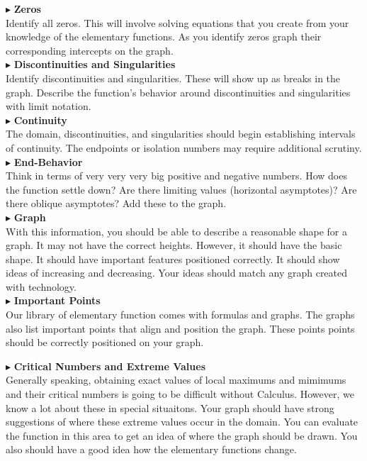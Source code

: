 \documentclass{ximera}
\begin{document}
$\blacktriangleright$ \textbf{\textcolor{red!10!blue!90!}{Zeros}} \\
Identify all zeros.  This will involve solving equations that you create from your knowledge of the elementary functions. As you identify zeros graph their corresponding intercepts on the graph.\\




$\blacktriangleright$ \textbf{\textcolor{red!10!blue!90!}{Discontinuities and Singularities}} \\
Identify discontinuities and singularities.  These will show up as breaks in the graph. Describe the function's behavior around discontinuities and singularities with limit notation.\\





$\blacktriangleright$ \textbf{\textcolor{red!10!blue!90!}{Continuity}} \\
The domain, discontinuities, and singularities should begin establishing intervals of continuity.  The endpoints or isolation numbers may require additional scrutiny.  \\


$\blacktriangleright$ \textbf{\textcolor{red!10!blue!90!}{End-Behavior}} \\
Think in terms of very very very big positive and negative numbers.  How does the function settle down?  Are there limiting values (horizontal asymptotes)?  Are there oblique asymptotes? Add these to the graph. \\


$\blacktriangleright$ \textbf{\textcolor{red!10!blue!90!}{Graph}} \\
With this information, you should be able to describe a reasonable shape for a graph.  It may not have the correct heights. However, it should have the basic shape.  It should have important features positioned correctly. It should show ideas of increasing and decreasing. Your ideas should match any graph created with technology.\\


$\blacktriangleright$ \textbf{\textcolor{red!10!blue!90!}{Important Points}} \\
Our library of elementary function comes with formulas and graphs.  The graphs also list important points that align and position the graph.  These points points should be correctly positioned on your graph.


$\blacktriangleright$ \textbf{\textcolor{red!10!blue!90!}{Critical Numbers and Extreme Values}} \\
Generally speaking, obtaining exact values of local maximums and mimimums and their critical numbers is going to be difficult without Calculus.  However, we know a lot about these in special situaitons. Your graph should have strong suggestions of where these extreme values occur in the domain. You can evaluate the function in this area to get an idea of where the graph should be drawn.  You also should have a good idea how the elementary functions change.
\end{document}
